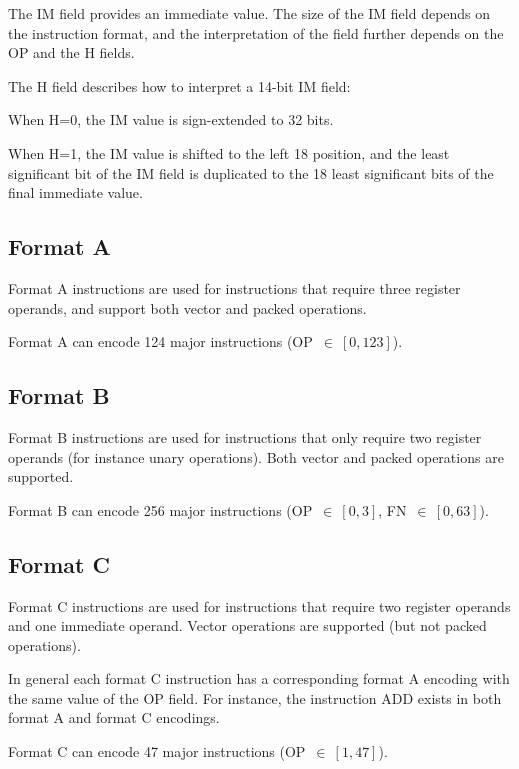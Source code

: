 The IM field provides an immediate value. The size of the IM field depends on
the instruction format, and the interpretation of the field further depends on
the OP and the H fields.

The H field describes how to interpret a 14-bit IM field:

\begin{bulletitems}
  \item When H=0, the IM value is sign-extended to 32 bits.
  \item When H=1, the IM value is shifted to the left 18 position, and the
        least significant bit of the IM field is duplicated to the 18 least
        significant bits of the final immediate value.
\end{bulletitems}

\subsection{Format A}

Format A instructions are used for instructions that require three register
operands, and support both vector and packed operations.

Format A can encode 124 major instructions (OP~$\in~[0,123]$).

\subsection{Format B}

Format B instructions are used for instructions that only require two register
operands (for instance unary operations). Both vector and packed operations are
supported.

Format B can encode 256 major instructions (OP~$\in~[0,3]$, FN~$\in~[0,63]$).

\subsection{Format C}

Format C instructions are used for instructions that require two register
operands and one immediate operand. Vector operations are supported (but not
packed operations).

In general each format C instruction has a corresponding format A encoding with
the same value of the OP field. For instance, the instruction ADD exists in
both format A and format C encodings.

Format C can encode 47 major instructions (OP~$\in~[1,47]$).

